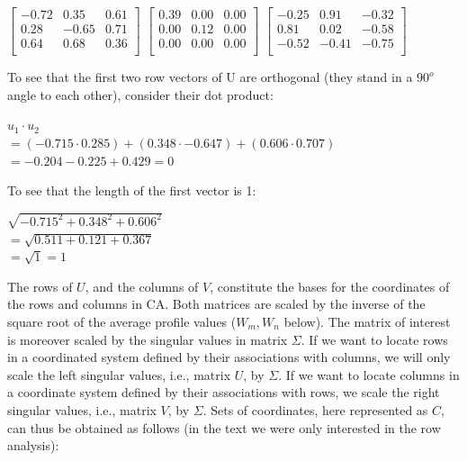 \begin{paperappendix}
\begin{exe}
$\begin{bmatrix}
  -0.72 & 0.35 & 0.61 \\ 
   0.28 & -0.65 & 0.71 \\ 
   0.64 & 0.68 & 0.36 \\
\end{bmatrix}$
%
\hspace{1em}
  $\begin{bmatrix}
   0.39 & 0.00 & 0.00 \\ 
   0.00 & 0.12 & 0.00 \\ 
   0.00 & 0.00 & 0.00 \\ 
 \end{bmatrix}$
%
\hspace{1em}
%
  $\begin{bmatrix}
   -0.25 & 0.91 & -0.32 \\ 
   0.81 & 0.02 & -0.58 \\ 
    -0.52 & -0.41 & -0.75 \\
    \end{bmatrix}$
 \end{exe}
%
 To see that the first two row vectors of U are orthogonal (they stand in a $90^o$ angle to each other), consider their
 dot product:

 \begin{exe}
   \ex $u_1\cdot u_2$ \\
   $=(-0.715 \cdot 0.285) + (0.348 \cdot -0.647) + (0.606 \cdot 0.707)$\\
   $=-0.204 -0.225 + 0.429 = 0$
 \end{exe}
%
 To see that the length of the first vector is 1:

 \begin{exe}
   \ex $\sqrt{-0.715^2 + 0.348^2 + 0.606^2}$\\
   $=\sqrt{0.511 + 0.121 + 0.367}$\\
   $=\sqrt{1} = 1$
 \end{exe}
%
 The rows of $U$, and the columns of $V$, constitute the bases for the coordinates of the rows and columns in CA.
 Both matrices are scaled by the inverse of the square root of the average profile values ($W_m, W_n$ below).
 The matrix of interest is moreover scaled by the singular values in matrix $\Sigma$.
 If we want to locate rows in a coordinated system defined by their associations with columns, we
 will only scale the left singular values, i.e., matrix $U$, by $\Sigma$.
 If we want to locate columns in a coordinate system defined by their associations with rows, we scale the right singular values, i.e., matrix
 $V$, by $\Sigma$. Sets of coordinates, here represented as $C$, can thus be
 obtained as follows (in the text we were only interested in the row
 analysis):
 

\end{paperappendix}
